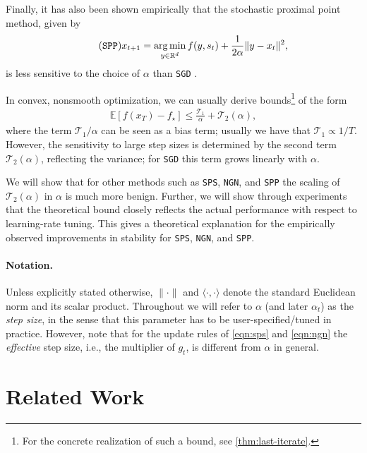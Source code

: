 \documentclass{article}
\DeclareMathOperator*{\argmin}{arg\,min}
\newcommand{\iprod}[2]{\langle #1, #2 \rangle}
\newcommand{\R}{\mathbb{R}}
\newcommand{\E}{\mathbb{E}}
\newcommand{\SGD}{{\texttt{SGD}}}
\newcommand{\SPP}{{\texttt{SPP}}}
\newcommand{\SPS}{{\texttt{SPS}}}
\newcommand{\NGN}{{\texttt{NGN}}}
\theoremstyle{plain}
\theoremstyle{definition}
\theoremstyle{remark}
\begin{document}
Finally, it has also been shown empirically that the stochastic proximal point method, given by
\begin{align}
    \label{eqn:spp}\tag{\SPP{}}
    x_{t+1} = \argmin_{y\in \R^d} f(y,s_t) + \frac{1}{2\alpha} \|y-x_t\|^2,
\end{align}
is less sensitive to the choice of $\alpha$ than \SGD{} \citep{Asi2019,Davis2019,Milzarek2024}.


In convex, nonsmooth optimization, we can usually derive bounds\footnote{For the concrete realization of such a bound, see \cref{thm:last-iterate}.} of the form
\begin{align*}
    \E[f(x_T) - f_\star] \leq \frac{\mathcal{T}_1}{\alpha} + \mathcal{T}_2(\alpha),
\end{align*}
where the term $\mathcal{T}_1/\alpha$ can be seen as a bias term; usually we have that $\mathcal{T}_1 \propto 1/T$.
However, the sensitivity to large step sizes is determined by the second term $\mathcal{T}_2(\alpha)$, reflecting the variance; for \SGD{} this term grows linearly with $\alpha$.

We will show that for other methods such as \SPS{}, \NGN{}, and \SPP{} the scaling  of $\mathcal{T}_2(\alpha)$ in $\alpha$ is much more benign. Further, we will show through experiments that the theoretical bound closely reflects the actual performance with respect to learning-rate tuning. This gives a theoretical explanation for the empirically observed improvements in stability for \SPS{}, \NGN{}, and \SPP{}.


\paragraph{Notation.}
%
Unless explicitly stated otherwise, $\|\cdot\|$ and $\iprod{\cdot}{\cdot}$ denote the standard Euclidean norm and its scalar product.
Throughout we will refer to $\alpha$ (and later $\alpha_t$) as the \emph{step size}, in the sense that this parameter has to be user-specified/tuned in practice. However, note that for the update rules of \eqref{eqn:sps} and \eqref{eqn:ngn} the \emph{effective} step size, i.e., the multiplier of $g_t$, is different from $\alpha$ in general. 
\section{Related Work}\label{sec:related-work}
%
\end{document}
